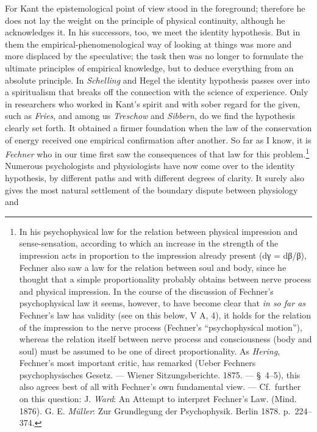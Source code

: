 \documentclass[12pt,a4paper]{book}
\newcommand{\opage}[1]{\marginnote{\footnotesize\textit{[#1]}}}
\begin{document}
For Kant the epistemological point of view stood in the foreground;
therefore he does not lay the weight on the principle of physical
\opage{83}continuity, although he acknowledges it. In his successors,
too, we meet the identity hypothesis. But in them the
empirical-phenomenological way of looking at things was more and more
displaced by the speculative; the task then was no longer to formulate
the ultimate principles of empirical knowledge, but to deduce
everything from an absolute principle. In \emph{Schelling} and Hegel
the identity hypothesis passes over into a spiritualism that breaks off
the connection with the science of experience. Only in researchers who
worked in Kant's spirit and with sober regard for the given, such as
\emph{Fries}, and among us \emph{Treschow} and \emph{Sibbern}, do we
find the hypothesis clearly set forth. It obtained a firmer foundation
when the law of the conservation of energy received one empirical
confirmation after another. So far as I know, it is \emph{Fechner} who
in our time first saw the consequences of that law
for this problem.\footnote{In his psychophysical law for the relation
between physical impression and sense-sensation, according to which an
increase in the strength of the impression acts in proportion to the
impression already present (dγ = dβ/β), Fechner also saw a law for the
relation between soul and body, since he thought that a simple
proportionality probably obtains between nerve process and physical
impression. In the course of the discussion of Fechner's psychophysical
law it seems, however, to have become clear that \emph{in so far as}
Fechner's law has validity (see on this below, V A, 4), it holds for
the relation of the impression to the nerve process (Fechner's
``psychophysical motion''), whereas the relation itself between nerve
process and consciousness (body and soul) must be assumed to be one of
direct proportionality. As \emph{Hering}, Fechner's most important
critic, has remarked (Ueber Fechners psychophysisches Gesetz. ---
Wiener Sitzungsberichte. 1875. --- §~4--5), this also agrees best of
all with Fechner's own fundamental view. --- Cf.\ further on this
question: J. \emph{Ward}: An Attempt to interpret Fechner's Law.
(Mind. 1876). G. E. \emph{Müller}: Zur Grundlegung der Psychophysik.
Berlin 1878. p.~224--374.} Numerous psychologists and physiologists
have now come over to the identity hypothesis, by different paths and
with different degrees of clarity. It surely also gives the most
natural settlement of the boundary dispute between physiology and
\end{document}
